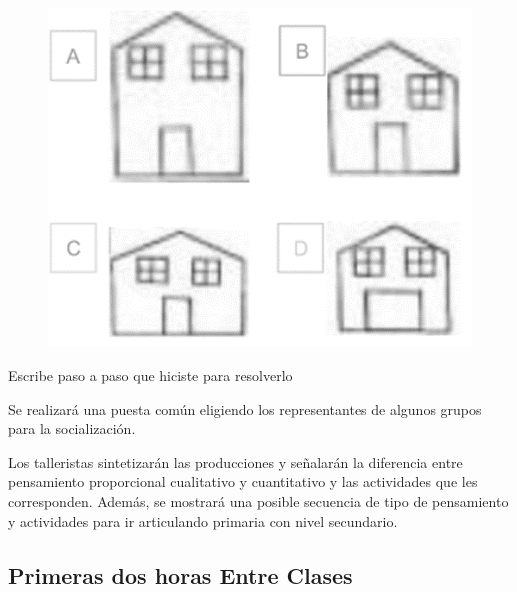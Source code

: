 \documentclass[oneside,spanish]{amsart}
\numberwithin{equation}{section}
\numberwithin{figure}{section}
\begin{document}
\begin{description}[itemsep=10pt]
    \begin{figure}[h]
        \centering
        \includegraphics{imagenes/casa2.png}
        \label{fig:casa2}
    \end{figure}

    Escribe paso a paso que hiciste para resolverlo
    
    Se realizará una puesta común eligiendo los representantes de algunos grupos para la socialización.
    
    Los talleristas sintetizarán las producciones y señalarán la diferencia entre pensamiento proporcional cualitativo y cuantitativo y las actividades que les corresponden. Además, se mostrará una posible secuencia de tipo de pensamiento y actividades para ir articulando primaria con nivel secundario.


\end{description}

\subsection{Primeras dos horas Entre Clases\label{subsec:Primeras-dos-EC}}
\end{document}
